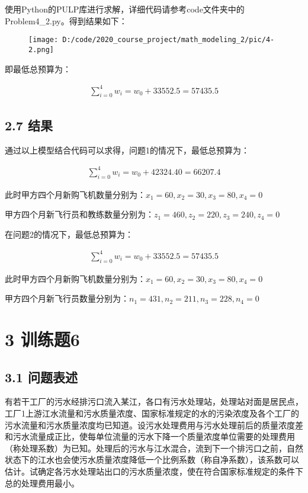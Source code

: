 \documentclass[bachelor,openany,oneside,color]{buaathesis}
\begin{document}
使用Python的PULP库进行求解，详细代码请参考code文件夹中的Problem4\_2.py。得到结果如下：

\begin{figure}
\centering
\texttt{[image: D:/code/2020\_course\_project/math\_modeling\_2/pic/4-2.png]}
\caption{}
\end{figure}

即最低总预算为：

\begin{gather*}\sum_{i=0}^{4}w_i=w_0+33552.5=57435.5\end{gather*}

\hypertarget{header-n224}{%
\section{2.7 结果}\label{header-n224}}

通过以上模型结合代码可以求得，问题1的情况下，最低总预算为：

\begin{gather*}\sum_{i=0}^{4}w_i=w_0+42324.40=66207.4\end{gather*}

此时甲方四个月新购飞机数量分别为：\(x_1=60,x_2=30,x_3=80,x_4=0\)

甲方四个月新飞行员和教练数量分别为：\(z_1=460,z_2=220,z_3=240,z_4=0\)

在问题2的情况下，最低总预算为：

\begin{gather*}\sum_{i=0}^{4}w_i=w_0+33552.5=57435.5\end{gather*}

此时甲方四个月新购飞机数量分别为：\(x_1=60,x_2=30,x_3=80,x_4=0\)

甲方四个月新飞行员数量分别为：\(n_1=431,n_2=211,n_3=228,n_4=0\)

\hypertarget{header-n233}{%
\chapter{3 训练题6}\label{header-n233}}
\setcounter{table}{0}\setcounter{figure}{0}
\hypertarget{header-n234}{%
\section{3.1 问题表述}\label{header-n234}}

有若干工厂的污水经排污口流入某江，各口有污水处理站，处理站对面是居民点，工厂1上游江水流量和污水质量浓度、国家标准规定的水的污染浓度及各个工厂的污水流量和污水质量浓度均已知道。设污水处理费用与污水处理前后的质量浓度差和污水流量成正比，使每单位流量的污水下降一个质量浓度单位需要的处理费用（称处理系数）为已知。处理后的污水与江水混合，流到下一个排污口之前，自然状态下的江水也会使污水质量浓度降低一个比例系数（称自净系数），该系数可以估计。试确定各污水处理站出口的污水质量浓度，使在符合国家标准规定的条件下总的处理费用最小。
\end{document}
